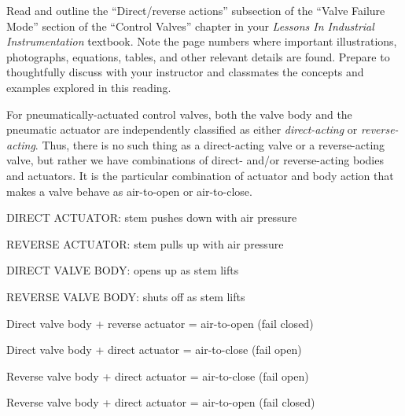 

Read and outline the ``Direct/reverse actions'' subsection of the ``Valve Failure Mode'' section of the ``Control Valves'' chapter in your {\it Lessons In Industrial Instrumentation} textbook.  Note the page numbers where important illustrations, photographs, equations, tables, and other relevant details are found.  Prepare to thoughtfully discuss with your instructor and classmates the concepts and examples explored in this reading.













For pneumatically-actuated control valves, both the valve body and the pneumatic actuator are independently classified as either {\it direct-acting} or {\it reverse-acting}.  Thus, there is no such thing as a direct-acting valve or a reverse-acting valve, but rather we have combinations of direct- and/or reverse-acting bodies and actuators.  It is the particular combination of actuator and body action that makes a valve behave as air-to-open or air-to-close.

\vskip 10pt

DIRECT ACTUATOR: stem pushes down with air pressure

REVERSE ACTUATOR: stem pulls up with air pressure

\vskip 10pt

DIRECT VALVE BODY: opens up as stem lifts

REVERSE VALVE BODY: shuts off as stem lifts

\vskip 10pt

Direct valve body + reverse actuator = air-to-open (fail closed)

Direct valve body + direct actuator = air-to-close (fail open)

\vskip 10pt

Reverse valve body + direct actuator = air-to-close (fail open)

Reverse valve body + direct actuator = air-to-open (fail closed)

